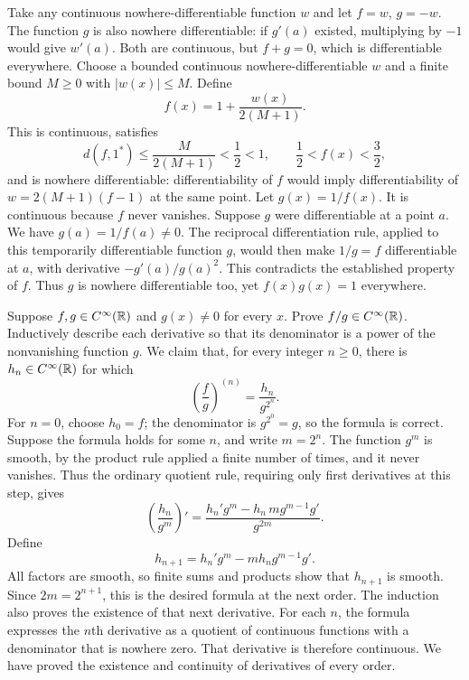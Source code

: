 Take any continuous nowhere-differentiable function $w$ and let
$f=w$, $g=-w$. The function $g$ is also nowhere differentiable:
if $g'(a)$ existed, multiplying by $-1$ would give $w'(a)$.
Both are continuous, but $f+g=0$, which is differentiable everywhere.
Choose a bounded continuous nowhere-differentiable $w$ and a finite
bound $M\geq0$ with $|w(x)|\leq M$. Define
\[
 f(x)=1+\frac{w(x)}{2(M+1)}.
\]
This is continuous, satisfies
\[
 d(f,1^*)\leq\frac{M}{2(M+1)}<\frac12<1,
 \qquad \frac12<f(x)<\frac32,
\]
and is nowhere differentiable: differentiability of $f$ would imply
differentiability of $w=2(M+1)(f-1)$ at the same point.
Let $g(x)=1/f(x)$. It is continuous because $f$ never vanishes.
Suppose $g$ were differentiable at a point $a$. We have
$g(a)=1/f(a)\ne0$. The reciprocal differentiation rule, applied
to this temporarily differentiable function $g$, would then make
$1/g=f$ differentiable at $a$, with derivative
$-g'(a)/g(a)^2$. This contradicts the established property of $f$.
Thus $g$ is nowhere differentiable too, yet $f(x)g(x)=1$ everywhere.

\goal Suppose $f,g\in C^\infty(\mathbb{R})$ and $g(x)\ne0$ for every $x$.
Prove $f/g\in C^\infty(\mathbb{R})$.
\idea Inductively describe each derivative so that its denominator
is a power of the nonvanishing function $g$.
We claim that, for every integer $n\geq0$, there is
$h_n\in C^\infty(\mathbb{R})$ for which
\[
 \left(\frac fg\right)^{(n)}=\frac{h_n}{g^{2^n}}.
\]
For $n=0$, choose $h_0=f$; the denominator is $g^{2^0}=g$,
so the formula is correct.
Suppose the formula holds for some $n$, and write $m=2^n$.
The function $g^m$ is smooth, by the product rule applied a finite
number of times, and it never vanishes. Thus the ordinary quotient
rule, requiring only first derivatives at this step, gives
\[
 \left(\frac{h_n}{g^m}\right)'
 =\frac{h_n'g^m-h_n\,m g^{m-1}g'}{g^{2m}}.
\]
Define
\[
 h_{n+1}=h_n'g^m-mh_n g^{m-1}g'.
\]
All factors are smooth, so finite sums and products show that
$h_{n+1}$ is smooth. Since $2m=2^{n+1}$, this is the desired
formula at the next order. The induction also proves the existence
of that next derivative.
For each $n$, the formula expresses the $n$th derivative as a
quotient of continuous functions with a denominator that is nowhere
zero. That derivative is therefore continuous. We have proved the
existence and continuity of derivatives of every order.

